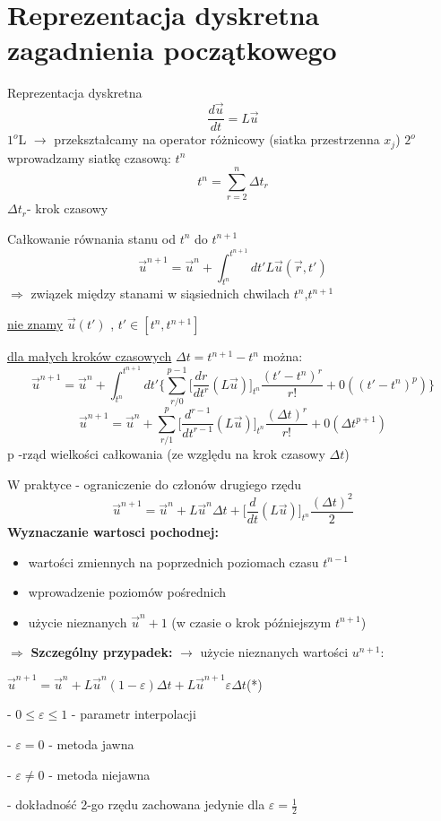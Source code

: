 \section{Reprezentacja dyskretna zagadnienia początkowego}
\begin{frame}{Reprezentacja dyskretna}
  $$\frac{d \vec{u}}{dt} = L\vec{u}$$
  $1^o$\quad L $\rightarrow$ przekształcamy na operator różnicowy (siatka przestrzenna $x_j$) \newline
  $2^o$ \quad wprowadzamy siatkę czasową: $t^n$ 
  $$t^n = \sum_{r=2}^{n}\Delta t_r$$
  $\Delta t_r $- krok czasowy
\end{frame}
\begin{frame}{Całkowanie równania stanu od $t^n$ do $t^{n+1}$}
  $${\vec{u}}^{n+1} = {\vec{u}}^n + \int_{t^n}^{t^{n+1}}dt' L\vec{u}(\vec{r},t')$$ 
  $\Rightarrow$ związek między stanami w siąsiednich chwilach $t^n$,$t^{n+1}$
  \begin{center}
  	\underline{nie znamy} \qquad $\vec{u}(t')$ , $t' \in [t^n,t^{n+1}]$ \par
  \end{center}
  \underline{dla małych kroków czasowych} $\Delta t = t^{n+1} - t^n$ można: 
  $${\vec{u}}^{n+1} = {\vec{u}}^n + \int_{t^n}^{t^{n+1}}dt'\Bigg\{ \sum_{r/0}^{p-1}\bigg[\frac{dr}{d t^r}(L\vec{u})\bigg]_{t^n}\frac{(t'-t^n)^r}{r!}+0((t'-t^n)^p)\Bigg\}$$
  $${\vec{u}}^{n+1} = {\vec{u}}^n + \sum_{r/1}^{p}\bigg[\frac{d^{r-1}}{d t^{r-1}}(L\vec{u})\bigg]_{t^n}\frac{(\Delta t)^r}{r!}+0(\Delta t^{p+1})$$
  p -rząd wielkości całkowania (ze względu na krok czasowy $\Delta t$)
\end{frame}
\begin{frame}{W praktyce - ograniczenie do członów drugiego rzędu}
  $$\vec{u} ^{n+1} = \vec{u} ^n + L\vec{u}^n\Delta t+\bigg[\frac{d}{dt}(L\vec{u})\bigg]_{t^n} \frac{(\Delta t)^2}{2}$$
  \textbf{Wyznaczanie wartosci pochodnej:}
  \begin{itemize}
    \item wartości zmiennych na poprzednich poziomach czasu $t^{n-1}$
    \item wprowadzenie poziomów pośrednich
    \item użycie nieznanych $\vec{u}^n+1$ (w czasie o krok późniejszym $t^{n+1}$)
  \end{itemize}
  $\Rightarrow$ \textbf{Szczególny przypadek:} $\rightarrow$ użycie nieznanych wartości $u^{n+1}$:
  \begin{center}
  	$\vec{u}^{n+1} = \vec{u}^n+L\vec{u}^n(1-\varepsilon)\Delta t+L\vec{u}^{n+1}\varepsilon \Delta t $\qquad(*)
  \end{center}
  \begin{description}
    \item - $0 \leqslant \varepsilon \leqslant 1$ - parametr interpolacji
    \item - $\varepsilon = 0$ - metoda jawna 
    \item - $\varepsilon \not= 0$ - metoda niejawna
    \item - dokładność 2-go rzędu zachowana jedynie dla $\varepsilon=\frac{1}{2}$
  \end{description}
  
\end{frame}
